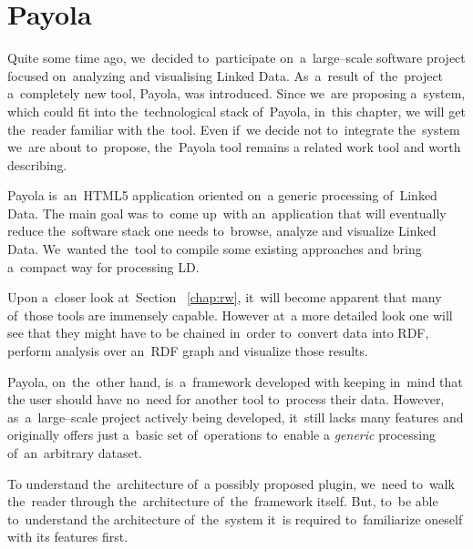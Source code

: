\chapter{Payola}
\label{ch:payola}

Quite some time ago, we~decided to~participate on~a~large--scale software 
project focused on~analyzing and visualising Linked Data. As~a~result of~the~project
a~completely new tool, Payola, was introduced. Since we~are proposing a~system, which could fit into the~technological stack of~Payola, in~this chapter, 
we will get the~reader familiar with the~tool. Even if~we  decide 
not to~integrate the~system we~are about to~propose, the~Payola tool remains
a related work tool and worth describing.

Payola is~an~HTML5 application oriented on~a generic processing of~Linked Data. 
The main goal was to~come up~with an~application that will eventually reduce the~software 
stack one needs to~browse, analyze and visualize Linked Data. We~wanted the~tool 
to compile some existing approaches and bring a~compact way for processing LD.

Upon a~closer look at~Section ~\ref{chap:rw}, it~will become apparent that many of~those tools are
immensely capable. However at~a more detailed look one will see that they might have to
be chained in~order to~convert data into 
RDF, perform analysis over an~RDF graph and visualize those results.

Payola, on~the~other hand, is~a~framework developed with keeping in~mind that 
the user should have no~need for another tool to~process their data. However, as~a~large--scale project actively being developed, it~still lacks many 
features and originally offers just a~basic set of~operations to~enable a
\emph{generic} processing of~an~arbitrary dataset.

To understand the~architecture of~a possibly proposed plugin, we~need to~walk the~reader 
through the~architecture of~the~framework itself. But, to~be able to~understand 
the architecture of~the~system it~is required to~familiarize oneself with its features first.

